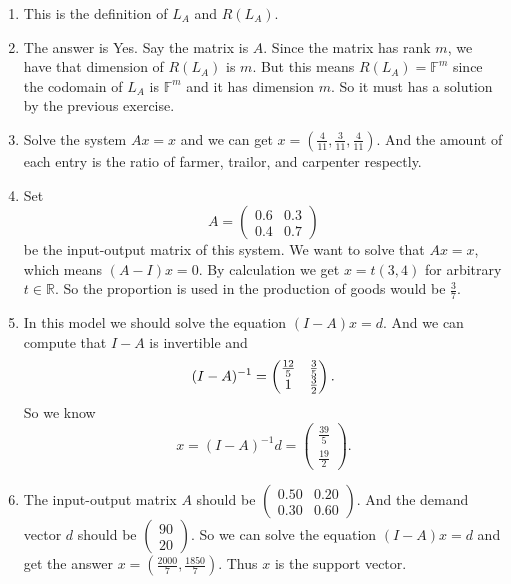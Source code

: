 \begin{enumerate}
\begin{enumerate}
\end{enumerate}
\item This is the definition of $L_A$ and $R(L_A)$.
\item The answer is Yes. Say the matrix is $A$. Since the matrix has rank $m$, we have that dimension of $R(L_A)$ is $m$. But this means $R(L_A)=\mathbb{F}^m$ since the codomain of $L_A$ is $\mathbb{F}^m$ and it has dimension $m$. So it must has a solution by the previous exercise.
\item Solve the system $Ax=x$ and we can get $x=(\frac{4}{11},\frac{3}{11},\frac{4}{11})$. And the amount of each entry is the ratio of farmer, trailor, and carpenter respectly.
\item Set 
\[A=\begin{pmatrix}0.6&0.3\\0.4&0.7\end{pmatrix}\]
be the input-output matrix of this system. We want to solve that $Ax=x$, which means $(A-I)x=0$. By calculation we get $x=t(3,4)$ for arbitrary $t\in \mathbb{R}$. So the proportion is used in the production of goods would be $\frac{3}{7}$. 
\item In this model we should solve the equation $(I-A)x=d$. And we can compute that $I-A$ is invertible and
\[(I-A)^{-1}=\begin{pmatrix}\frac{12}{5} & \frac{3}{5}\cr 1 & \frac{3}{2}\end{pmatrix}.\]
So we know 
\[x=(I-A)^{-1}d=\begin{pmatrix}\frac{39}{5}\\\frac{19}{2}\end{pmatrix}.\]
\item The input-output matrix $A$ should be $\begin{pmatrix}0.50&0.20\\0.30&0.60\end{pmatrix}$. And the demand vector $d$ should be $\begin{pmatrix}90\\20\end{pmatrix}$. So we can solve the equation $(I-A)x=d$ and get the answer $x=(\frac{2000}{7},\frac{1850}{7})$. Thus $x$ is the support vector.
\end{enumerate}